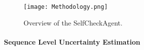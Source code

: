\begin{figure*}[h]
    \centering
    \texttt{[image: Methodology.png]}
    \caption{Overview of the SelfCheckAgent.}
    \label{fig:Selfcheckagent}
\end{figure*}



\paragraph{Sequence Level Uncertainty Estimation}


